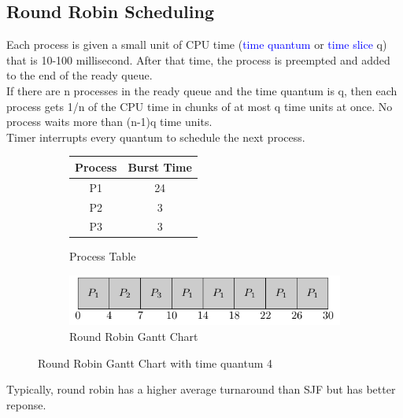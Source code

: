 \documentclass[oneside]{book}
\begin{document}
            \subsection{Round Robin Scheduling}
                Each process is given a small unit of CPU time (\textcolor{blue}{time quantum} or \textcolor{blue}{time slice} q) that
                is 10-100 millisecond.
                After that time, the process is preempted and added to the end of the ready queue.\\
                If there are n processes in the ready queue and the time quantum is q, then each process
                gets 1/n of the CPU time in chunks of at most q time units at once. No process waits more
                than (n-1)q time units.\\
                Timer interrupts every quantum to schedule the next process.\\
                \begin{figure}[H]
                    \centering
                    \begin{subfigure}{0.5\linewidth}
                        \centering
                        \begin{tabular}{cc}
                            Process & Burst Time\\
                            \toprule
                            P1 & 24\\
                            P2 & 3\\
                            P3 & 3\\
                        \end{tabular}
                        \caption{Process Table}
                    \end{subfigure}%
                    \begin{subfigure}{0.5\linewidth}
                        \centering
                        \includegraphics{figures/rr_time_quant_4.pdf}
                        \caption{Round Robin Gantt Chart}
                    \end{subfigure}
                    \caption{Round Robin Gantt Chart with time quantum 4}
                \end{figure}
                Typically, round robin has a higher average turnaround than SJF but has better reponse.
\end{document}
